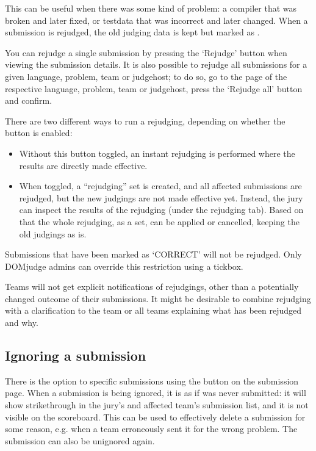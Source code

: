 \documentclass[a4paper,10pt,english,openany]{sphinxmanual}
\begin{document}
\sphinxAtStartPar
This can be useful when there was some kind of problem: a compiler
that was broken and later fixed, or testdata that was incorrect and
later changed. When a submission is rejudged, the old judging data is
kept but marked as .

\sphinxAtStartPar
You can rejudge a single submission by pressing the ‘Rejudge’ button
when viewing the submission details. It is also possible to rejudge
all submissions for a given language, problem, team or judgehost; to
do so, go to the page of the respective language, problem, team or
judgehost, press the ‘Rejudge all’ button and confirm.

\sphinxAtStartPar
There are two different ways to run a rejudging, depending on whether
the  button is enabled:
\begin{itemize}
\item {} 
\sphinxAtStartPar
Without this button toggled, an instant rejudging is
performed where the results are directly made effective.

\item {} 
\sphinxAtStartPar
When toggled, a “rejudging” set is created, and all affected
submissions are rejudged, but the new judgings are not made
effective yet. Instead, the jury can inspect the results of the
rejudging (under the rejudging tab). Based on that the whole
rejudging, as a set, can be applied or cancelled, keeping the old
judgings as is.

\end{itemize}

\sphinxAtStartPar
Submissions that have been marked as ‘CORRECT’ will not be rejudged.
Only DOMjudge admins can override this restriction using a tickbox.

\sphinxAtStartPar
Teams will not get explicit notifications of rejudgings, other than a
potentially changed outcome of their submissions. It might be desirable
to combine rejudging with a clarification to the team or all teams
explaining what has been rejudged and why.


\subsection{Ignoring a submission}
\label{\detokenize{judging:ignoring-a-submission}}
\sphinxAtStartPar
There is the option to  specific submissions
using the button on the submission page. When a submission is being
ignored, it is as if was never submitted: it will show strike\sphinxhyphen{}through
in the jury’s and affected team’s submission list, and it is not
visible on the scoreboard. This can be used to effectively
delete a submission for some reason, e.g. when a team erroneously sent
it for the wrong problem. The submission can also be unignored again.
\end{document}
